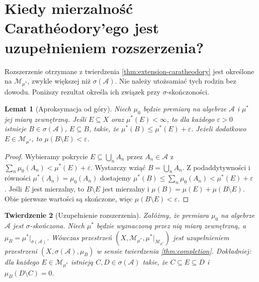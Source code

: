 \documentclass[11pt,a4paper,oneside]{book}
\numberwithin{equation}{chapter}
\theoremstyle{plain}
\newtheorem{twierdzenie}{Twierdzenie}[chapter]
\newtheorem{lemat}[twierdzenie]{Lemat}
\theoremstyle{definition}
\theoremstyle{remark}
\begin{document}
\section{Kiedy mierzalność Carathéodory'ego jest uzupełnieniem rozszerzenia?}

Rozszerzenie otrzymane z twierdzenia
\ref{thm:extension-caratheodory} jest określone na
$\mathcal M_{\mu^*}$, zwykle większej niż $\sigma(\mathcal A)$.
Nie należy utożsamiać tych rodzin bez dowodu.
Poniższy rezultat określa ich związek przy
$\sigma$-skończoności.

\begin{lemat}[Aproksymacja od góry]
\label{lem:outer-approx-algebra}
Niech $\mu_0$ będzie premiarą na algebrze $\mathcal A$ i
$\mu^*$ jej miarą zewnętrzną. Jeśli $E\subseteq X$ oraz
$\mu^*(E)<\infty$, to dla każdego $\varepsilon>0$
istnieje $B\in\sigma(\mathcal A)$, $E\subseteq B$, takie, że
$\mu^*(B)\le\mu^*(E)+\varepsilon$.
Jeżeli dodatkowo $E\in\mathcal M_{\mu^*}$, to
$\mu(B\setminus E)<\varepsilon$.
\end{lemat}

\begin{proof}
Wybieramy pokrycie $E\subseteq\bigcup_nA_n$ przez
$A_n\in\mathcal A$ z $\sum_n\mu_0(A_n)<\mu^*(E)+\varepsilon$.
Wystarczy wziąć $B=\bigcup_nA_n$. Z podaddytywności i
równości $\mu^*(A_n)=\mu_0(A_n)$ dostajemy
$\mu^*(B)\le\sum_n\mu_0(A_n)<\mu^*(E)+\varepsilon$.
Jeśli $E$ jest mierzalny, to $B\setminus E$ jest mierzalny
i $\mu(B)=\mu(E)+\mu(B\setminus E)$.
Obie pierwsze wartości są skończone, więc
$\mu(B\setminus E)<\varepsilon$.
\end{proof}

\begin{twierdzenie}[Uzupełnienie rozszerzenia]
\label{thm:caratheodory-completion}
Załóżmy, że premiara $\mu_0$ na algebrze $\mathcal A$
jest $\sigma$-skończona. Niech $\mu^*$ będzie wyznaczoną
przez nią miarą zewnętrzną, a $\mu_B=\mu^*|_{\sigma(\mathcal A)}$.
Wówczas przestrzeń
$(X,\mathcal M_{\mu^*},\mu^*|_{\mathcal M_{\mu^*}})$
jest uzupełnieniem przestrzeni
$(X,\sigma(\mathcal A),\mu_B)$ w sensie twierdzenia
\ref{thm:completion}. Dokładniej: dla każdego
$E\in\mathcal M_{\mu^*}$ istnieją
$C,D\in\sigma(\mathcal A)$ takie, że
$C\subseteq E\subseteq D$ i $\mu_B(D\setminus C)=0$.
\end{twierdzenie}
\end{document}
